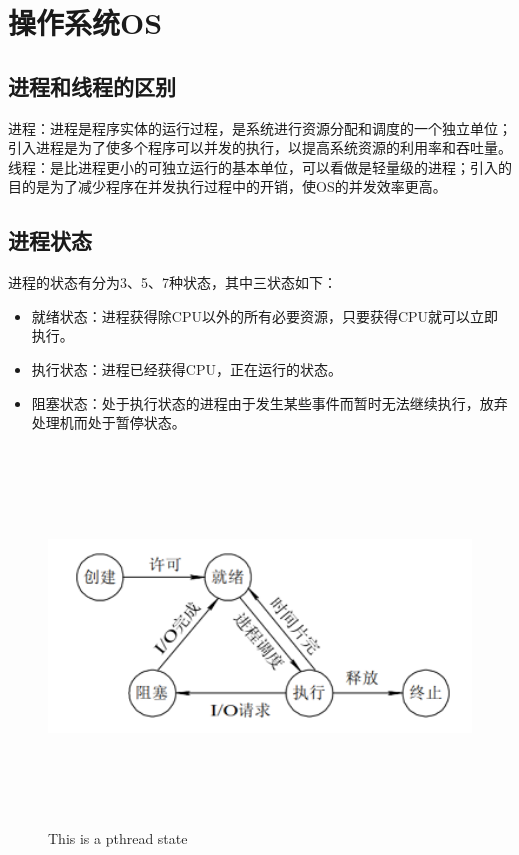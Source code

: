 \chapter{操作系统OS}
\section{进程和线程的区别}
进程：进程是程序实体的运行过程，是系统进行资源分配和调度的一个独立单位；引入进程是为了使多个程序可以并发的执行，以提高系统资源的利用率和吞吐量。\\
线程：是比进程更小的可独立运行的基本单位，可以看做是轻量级的进程；引入的目的是为了减少程序在并发执行过程中的开销，使OS的并发效率更高。\\
\section{进程状态}
进程的状态有分为3、5、7种状态，其中三状态如下：
\begin{itemize}
\item 就绪状态：进程获得除CPU以外的所有必要资源，只要获得CPU就可以立即执行。
\item 执行状态：进程已经获得CPU，正在运行的状态。
\item 阻塞状态：处于执行状态的进程由于发生某些事件而暂时无法继续执行，放弃处理机而处于暂停状态。
\end{itemize}
\begin{figure} 
\centering
\includegraphics[width=12cm,height=10cm]{Image/chp3_2.png}
\caption{This is a pthread state}
\label{fig:pthread}
\end{figure}
